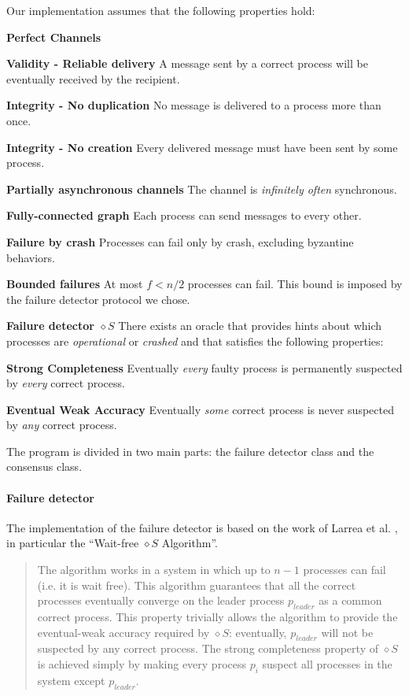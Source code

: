 \documentclass[a4paper]{article}
\begin{document}
Our implementation assumes that the following properties hold:
\begin{compactitem}
  \item \textbf{Perfect Channels} \cite{models}
    \begin{compactitem}
      \item \textbf{Validity - Reliable delivery} A message sent by a correct process will be eventually received by the recipient.
      \item \textbf{Integrity - No duplication} No message is delivered to a process more than once.
      \item \textbf{Integrity - No creation} Every delivered message must have been sent by some process.
    \end{compactitem}
  \item \textbf{Partially asynchronous channels} The channel is \emph{infinitely often} synchronous.
  \item \textbf{Fully-connected graph} Each process can send messages to every other.
  \item \textbf{Failure by crash} Processes can fail only by crash, excluding byzantine behaviors.
  \item \textbf{Bounded failures} At most $f < n / 2$ processes can fail. This bound is imposed by the failure detector protocol we chose.
  \item \textbf{Failure detector $\diamond{}S$} There exists an oracle that provides hints about which processes are \emph{operational} or \emph{crashed} and that satisfies the following properties:
  \begin{compactitem}
    \item \textbf{Strong Completeness} Eventually \emph{every} faulty process is permanently suspected by \emph{every} correct process.
    \item \textbf{Eventual Weak Accuracy} Eventually \emph{some} correct process is never suspected by \emph{any} correct process.
  \end{compactitem}
\end{compactitem}

The program is divided in two main parts: the failure detector class and the consensus class.

\paragraph{Failure detector}
The implementation of the failure detector is based on the work of Larrea et al. \cite{larrea2013}, in particular the ``Wait-free $\diamond{}S$ Algorithm''.
\begin{quote}
The algorithm works in a system in which up to $n - 1$ processes can fail (i.e. it is wait free). This algorithm guarantees that all the correct processes eventually converge on the leader process $p_{leader}$ as a common correct process. This property trivially allows the algorithm to provide the eventual-weak accuracy required by $\diamond{}S$: eventually, $p_{leader}$ will not be suspected by any correct process. The strong completeness property of $\diamond{}S$ is achieved simply by making every process $p_i$ suspect all processes in the system except $p_{leader}$.
\end{quote}
\end{document}
